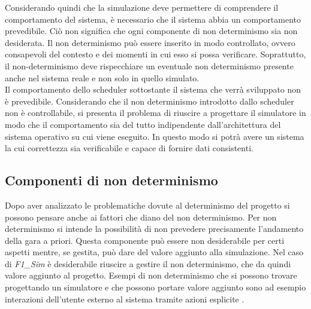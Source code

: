 Considerando quindi che la simulazione deve permettere di comprendere il
comportamento del sistema, è necessario che il sistema abbia 
un comportamento prevedibile. Ciò non significa che ogni componente di non
determinismo sia non desiderata. Il non determinismo
può essere inserito in modo controllato, ovvero consapevoli del contesto e dei
momenti in cui esso si possa verificare. Soprattutto,
il non-determinismo deve rispecchiare un eventuale non determinismo presente
anche nel sistema reale e non solo in quello simulato.\\
Il comportamento dello scheduler sottostante il sistema che verrà sviluppato non
è prevedibile. Considerando che il non determinismo
introdotto dallo scheduler non è controllabile, si presenta
il problema di riuscire a progettare il simulatore in modo
che il comportamento sia del tutto indipendente dall'architettura del sistema
operativo su cui viene eseguito. In questo
modo si potrà avere un sistema la cui correttezza sia verificabile e capace di
fornire dati consistenti.
\subsection{Componenti di non determinismo }
\label{non_determinismo}
Dopo aver analizzato le problematiche dovute al determinismo del progetto si
possono pensare anche ai fattori che diano del non determinismo.
Per non determinismo si intende la possibilit\`{a} di non prevedere precisamente
l'andamento della gara a priori. Questa componente pu\`{o} essere non
desiderabile per certi aspetti mentre, se gestita, pu\`{o} dare del valore
aggiunto alla simulazione. Nel caso di \emph{F1\_Sim} \`{e} desiderabile
riuscire a gestire il non determinismo, che da quindi valore aggiunto al
progetto.
Esempi di non determinismo che si possono trovare progettando un simulatore e
che possono portare valore aggiunto sono ad esempio interazioni dell'utente
esterno al sistema tramite azioni esplicite .

